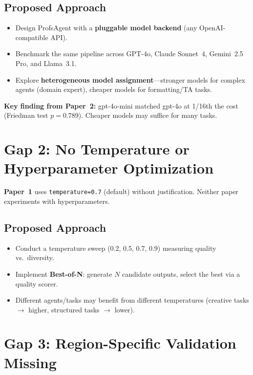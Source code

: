 \documentclass[11pt,a4paper]{article}
\begin{document}
\subsection{Proposed Approach}
\begin{itemize}[nosep]
    \item Design ProfsAgent with a \textbf{pluggable model backend} (any OpenAI-compatible API).
    \item Benchmark the same pipeline across GPT-4o, Claude Sonnet~4, Gemini~2.5 Pro, and Llama~3.1.
    \item Explore \textbf{heterogeneous model assignment}---stronger models for complex agents (domain expert), cheaper models for formatting/TA tasks.
\end{itemize}

\begin{notebox}
\textbf{Key finding from Paper~2:} gpt-4o-mini matched gpt-4o at 1/16th the cost (Friedman test $p=0.789$). Cheaper models may suffice for many tasks.
\end{notebox}

\section{Gap 2: No Temperature or Hyperparameter Optimization}

\textbf{Paper~1} uses \texttt{temperature=0.7} (default) without justification. Neither paper experiments with hyperparameters.

\subsection{Proposed Approach}
\begin{itemize}[nosep]
    \item Conduct a temperature sweep (0.2, 0.5, 0.7, 0.9) measuring quality vs.\ diversity.
    \item Implement \textbf{Best-of-N}: generate $N$ candidate outputs, select the best via a quality scorer.
    \item Different agents/tasks may benefit from different temperatures (creative tasks $\to$ higher, structured tasks $\to$ lower).
\end{itemize}

\section{Gap 3: Region-Specific Validation Missing}
\end{document}
